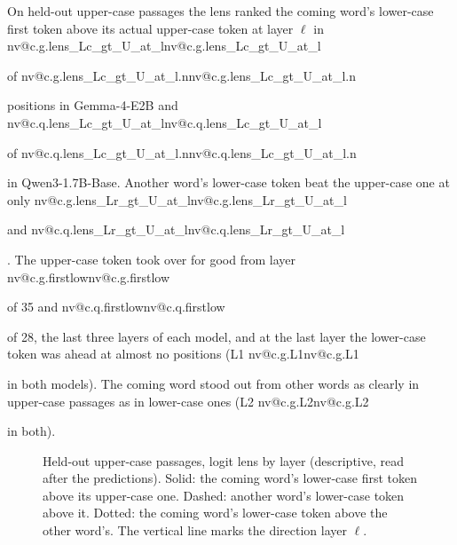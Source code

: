 \documentclass[11pt]{article}
\makeatletter
\newcommand{\nv}[1]{\ifcsname nv@#1\endcsname\csname nv@#1\endcsname\else\PackageError{numbers}{Unknown number key #1}{}\fi}
\newcommand{\G}[1]{\nv{c.g.#1}}
\newcommand{\Q}[1]{\nv{c.q.#1}}
\newcommand{\gm}{Gemma-4-E2B}
\newcommand{\qw}{Qwen3-1.7B-Base}
\makeatother
\begin{document}
On held-out upper-case passages the lens ranked the coming word's lower-case first token above its actual upper-case token at layer $\ell$ in \G{lens_Lc_gt_U_at_l} of \G{lens_Lc_gt_U_at_l.n} positions in \gm{} and \Q{lens_Lc_gt_U_at_l} of \Q{lens_Lc_gt_U_at_l.n} in \qw{}. Another word's lower-case token beat the upper-case one at only \G{lens_Lr_gt_U_at_l} and \Q{lens_Lr_gt_U_at_l}. The upper-case token took over for good from layer \G{firstlow} of 35 and \Q{firstlow} of 28, the last three layers of each model, and at the last layer the lower-case token was ahead at almost no positions (L1 \G{L1} in both models). The coming word stood out from other words as clearly in upper-case passages as in lower-case ones (L2 \G{L2} in both).

\begin{figure}[t]
\centering
{}\hfill
{}
\caption{Held-out upper-case passages, logit lens by layer (descriptive, read after the predictions). Solid: the coming word's lower-case first token above its upper-case one. Dashed: another word's lower-case token above it. Dotted: the coming word's lower-case token above the other word's. The vertical line marks the direction layer $\ell$.}
\label{fig:lens}
\end{figure}
\end{document}
